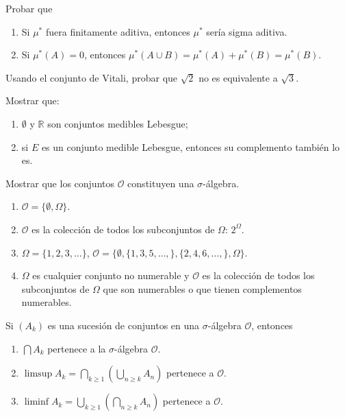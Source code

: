 \documentclass{book}
\newcommand{\rr}{\mathbb{R}}
\begin{document}
\begin{ejer}{} Probar que
\begin{enumerate}
\item Si $\mu^*$ fuera finitamente aditiva, entonces $\mu^*$ sería  sigma aditiva.
\item Si $\mu^*(A)=0$, entonces $\mu^*(A\cup B)=\mu^*(A)+\mu^*(B)=\mu^*(B)$.
\end{enumerate}
\end{ejer} 



\begin{ejer}{} Usando el conjunto de Vitali, probar que $\sqrt{2}$ no es equivalente a $\sqrt{3}$.
\end{ejer}

\begin{ejer}{} Mostrar que: 
\begin{enumerate}
\item $\emptyset$ y $\rr$ son conjuntos medibles Lebesgue; 
\item si $E$ es un conjunto medible Lebesgue, entonces su complemento tambi\'en lo es.
\end{enumerate}
\end{ejer} 

\begin{ejer}{} 
Mostrar que los conjuntos $ \mathcal{O}$ constituyen una $\sigma$-\'algebra.
\begin{enumerate}
\item $\mathcal{O}=\{\emptyset, \Omega\}$.
\item $\mathcal{O}$ es la colecci\'on de todos los subconjuntos de $\Omega$: $2^{\Omega}$.
\item $\Omega=\{1,2,3,\dots\}$, $\mathcal{O}=\{\emptyset,\{1,3,5,\dots,\},\{2,4,6,\dots,\},\Omega\}$.
\item $\Omega$ es cualquier conjunto no numerable y $\mathcal{O}$ es la colecci\'on de todos los subconjuntos
de $\Omega$ que son numerables o que tienen complementos numerables.
\end{enumerate}
\end{ejer} 


\begin{ejer}{} 
Si $(A_k)$ es una sucesi\'on de conjuntos en una $\sigma$-\'algebra $\mathcal{O}$, entonces
\begin{enumerate}
\item $\bigcap A_k$ pertenece a la $\sigma$-\'algebra $\mathcal{O}$.
\item $\limsup A_k=\bigcap\limits_{k\geq 1}\left(\bigcup\limits_{n\geq k} A_n\right)$ pertenece a $\mathcal{O}$.
\item $\liminf A_k=\bigcup\limits_{k\geq 1}\left(\bigcap\limits_{n\geq k} A_n\right)$ pertenece a $\mathcal{O}$.
 \end{enumerate}
 \end{ejer}  
\end{document}
